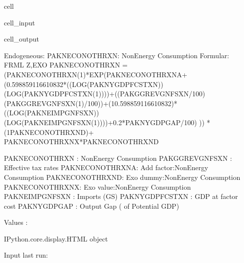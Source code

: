\documentclass[letterpaper,10pt,english]{jupyterBook}
\begin{document}
\begin{sphinxuseclass}{cell}\begin{sphinxVerbatimInput}

\begin{sphinxuseclass}{cell_input}
\begin{sphinxVerbatim}[commandchars=\\\{\}]
\end{sphinxVerbatim}

\end{sphinxuseclass}\end{sphinxVerbatimInput}
\begin{sphinxVerbatimOutput}

\begin{sphinxuseclass}{cell_output}
\begin{sphinxVerbatim}[commandchars=\\\{\}]
Endogeneous: PAKNECONOTHRXN: Non\PYGZhy{}Energy Consumption
Formular: FRML \PYGZlt{}Z,EXO\PYGZgt{} PAKNECONOTHRXN = (PAKNECONOTHRXN(\PYGZhy{}1)*EXP(\PYGZhy{}PAKNECONOTHRXN\PYGZus{}A+ (0.598859116610832*((LOG(PAKNYGDPFCSTXN))\PYGZhy{}(LOG(PAKNYGDPFCSTXN(\PYGZhy{}1))))+((PAKGGREVGNFSXN/100)\PYGZhy{}(PAKGGREVGNFSXN(\PYGZhy{}1)/100))+(1\PYGZhy{}0.598859116610832)*((LOG(PAKNEIMPGNFSXN))\PYGZhy{}(LOG(PAKNEIMPGNFSXN(\PYGZhy{}1))))+0.2*PAKNYGDPGAP\PYGZus{}/100) )) * (1\PYGZhy{}PAKNECONOTHRXN\PYGZus{}D)+ PAKNECONOTHRXN\PYGZus{}X*PAKNECONOTHRXN\PYGZus{}D  \PYGZdl{}

PAKNECONOTHRXN  : Non\PYGZhy{}Energy Consumption
PAKGGREVGNFSXN  : Effective tax rates
PAKNECONOTHRXN\PYGZus{}A: Add factor:Non\PYGZhy{}Energy Consumption
PAKNECONOTHRXN\PYGZus{}D: Exo dummy:Non\PYGZhy{}Energy Consumption
PAKNECONOTHRXN\PYGZus{}X: Exo value:Non\PYGZhy{}Energy Consumption
PAKNEIMPGNFSXN  : Imports (G\PYGZam{}S)
PAKNYGDPFCSTXN  : GDP at factor cost
PAKNYGDPGAP\PYGZus{}    : Output Gap (\PYGZpc{} of Potential GDP)

Values :
\end{sphinxVerbatim}

\begin{sphinxVerbatim}[commandchars=\\\{\}]
\PYGZlt{}IPython.core.display.HTML object\PYGZgt{}
\end{sphinxVerbatim}

\begin{sphinxVerbatim}[commandchars=\\\{\}]
Input last run:
\end{sphinxVerbatim}


\end{sphinxuseclass}
\end{sphinxVerbatimOutput}
\end{sphinxuseclass}
\end{document}
